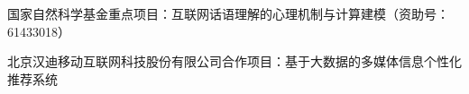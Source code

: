 \begin{resume}



  \begin{achievements}

  \item 国家自然科学基金重点项目：互联网话语理解的心理机制与计算建模（资助号：61433018）

  \item 北京汉迪移动互联网科技股份有限公司合作项目：基于大数据的多媒体信息个性化推荐系统

  \end{achievements}


\end{resume}
